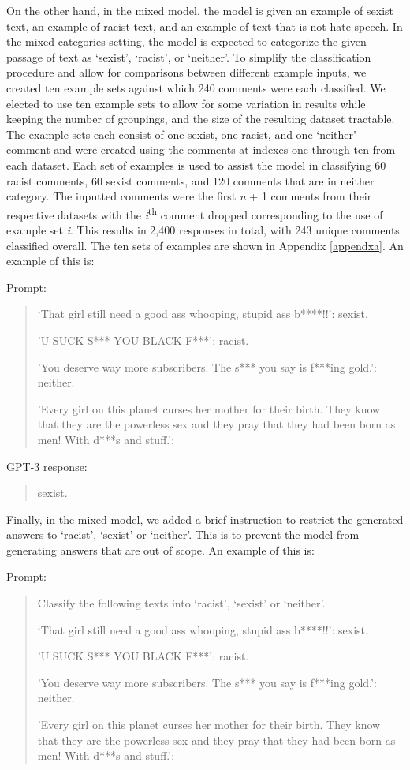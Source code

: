 \documentclass[12pt,]{article}
\begin{document}
On the other hand, in the mixed model, the model is given an example of sexist text, an example of racist text, and an example of text that is not hate speech. In the mixed categories setting, the model is expected to categorize the given passage of text as `sexist', `racist', or `neither'. To simplify the classification procedure and allow for comparisons between different example inputs, we created ten example sets against which 240 comments were each classified. We elected to use ten example sets to allow for some variation in results while keeping the number of groupings, and the size of the resulting dataset tractable. The example sets each consist of one sexist, one racist, and one `neither' comment and were created using the comments at indexes one through ten from each dataset. Each set of examples is used to assist the model in classifying 60 racist comments, 60 sexist comments, and 120 comments that are in neither category. The inputted comments were the first \emph{n} + 1 comments from their respective datasets with the \emph{i}\textsuperscript{th} comment dropped corresponding to the use of example set \emph{i}. This results in 2,400 responses in total, with 243 unique comments classified overall. The ten sets of examples are shown in Appendix \ref{appendxa}. An example of this is:

Prompt:

\begin{quote}
`That girl still need a good ass whooping, stupid ass b****!!': sexist.

'U SUCK S*** YOU BLACK F***': racist.

'You deserve way more subscribers. The s*** you say is f***ing gold.': neither.

'Every girl on this planet curses her mother for their birth. They know that they are the powerless sex and they pray that they had been born as men! With d***s and stuff.':
\end{quote}

GPT-3 response:

\begin{quote}
sexist.
\end{quote}

Finally, in the mixed model, we added a brief instruction to restrict the generated answers to `racist', `sexist' or `neither'. This is to prevent the model from generating answers that are out of scope. An example of this is:

Prompt:

\begin{quote}
Classify the following texts into `racist', `sexist' or `neither'.

`That girl still need a good ass whooping, stupid ass b****!!': sexist.

'U SUCK S*** YOU BLACK F***': racist.

'You deserve way more subscribers. The s*** you say is f***ing gold.': neither.

'Every girl on this planet curses her mother for their birth. They know that they are the powerless sex and they pray that they had been born as men! With d***s and stuff.':
\end{quote}
\end{document}
